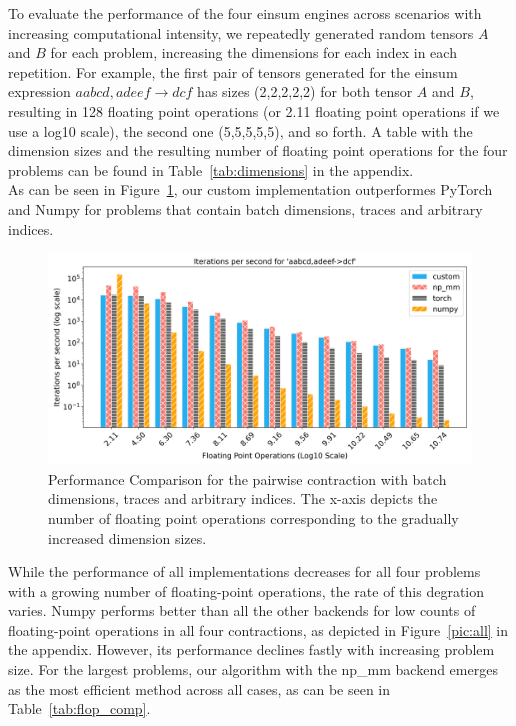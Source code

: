 \noindent To evaluate the performance of the four einsum engines across scenarios with increasing computational intensity, we repeatedly generated random tensors $A$ and $B$ for each problem, increasing the dimensions for each index in each repetition. For example, the first pair of tensors generated for the einsum expression $aabcd,adeef\rightarrow dcf$ has sizes (2,2,2,2,2) for both tensor $A$ and $B$, resulting in 128 floating point operations (or 2.11 floating point operations if we use a log10 scale), the second one (5,5,5,5,5), and so forth. A table with the dimension sizes and the resulting number of floating point operations for the four problems can be found in Table~\ref{tab:dimensions} in the appendix.\\

\noindent As can be seen in Figure~\ref{flops}, our custom implementation outperformes PyTorch and Numpy for problems that contain batch dimensions, traces and arbitrary indices.
\begin{figure}[h]
    \label{flops}
    \centering
    \includegraphics[width=1\textwidth]{images/aabcd_adeef__dcf.png}  %
    \caption{Performance Comparison for the pairwise contraction with batch dimensions, traces and arbitrary indices. The x-axis depicts the number of floating point operations corresponding to the gradually increased dimension sizes.}
\end{figure}

\noindent While the performance of all implementations decreases for all four problems with a growing number of floating-point operations, the rate of this degration varies. Numpy performs better than all the other backends for low counts of floating-point operations in all four contractions, as depicted in Figure~\ref{pic:all} in the appendix. However, its performance declines fastly with increasing problem size. For the largest problems, our algorithm with the np\_mm backend emerges as the most efficient method across all cases, as can be seen in Table~\ref{tab:flop_comp}.

